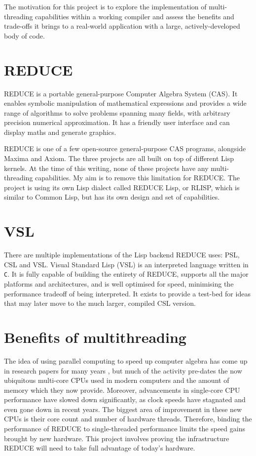 The motivation for this project is to explore the implementation of multi-threading
capabilities within a working compiler and assess the benefits and trade-offs it brings
to a real-world application with a large, actively-developed body of code.

\section{REDUCE}

REDUCE \cite{reduce} is a portable general-purpose Computer Algebra System (CAS). It enables symbolic
manipulation of mathematical expressions and provides a wide range of algorithms
to solve problems spanning many fields, with arbitrary precision numerical approximation.
It has a friendly user interface and can display maths and generate graphics.

REDUCE is one of a few open-source general-purpose CAS programs, alongside Maxima and Axiom.
The three projects are all built on top of different Lisp kernels. At the time of this writing,
none of these projects have any multi-threading capabilities. My aim is to remove this limitation
for REDUCE. The project is using its own Lisp dialect called REDUCE Lisp, or RLISP,
which is similar to Common Lisp, but has its own design and set of capabilities.

\section{VSL}

There are multiple implementations of the Lisp backend REDUCE uses: PSL, CSL and VSL.
Visual Standard Lisp (VSL) is an interpreted language written
in \texttt{C}. It is fully capable of building the entirety of REDUCE, supports all the major
platforms and architectures, and is well optimised for speed, minimising the performance tradeoff
of being interpreted. It exists to provide a test-bed for ideas that may later move to the much larger,
compiled CSL version.

\section{Benefits of multithreading}
The idea of using parallel computing to speed up computer algebra has come
up in research papers for many years \cite{algebra-parallelism},
but much of the activity
pre-dates the now ubiquitous multi-core CPUs used in modern computers and the amount of memory
which they now provide. Moreover, advancements in single-core CPU performance have slowed down
significantly, as clock speeds have stagnated and even gone down in recent years. The biggest
area of improvement in these new CPUs is their core count and number of hardware threads.
Therefore, binding the performance of REDUCE to single-threaded performance limits the speed gains
brought by new hardware. This project involves proving the infrastructure
REDUCE will need to take full advantage of today's hardware.

